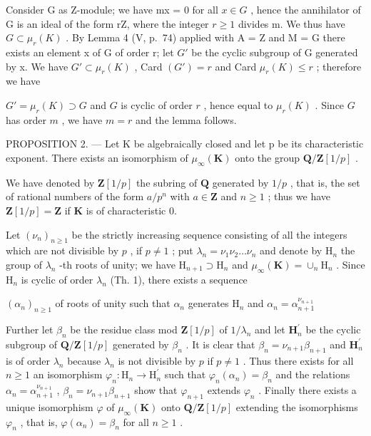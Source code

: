 Consider G as Z-module; we have mx = 0 for all \(x \in G\) , hence the annihilator of G is an ideal of the form rZ, where the integer \(r \geqslant 1\) divides m. We thus have \(G \subset \mu_{r}(K)\) . By Lemma 4 (V, p.~74) applied with A = Z and M = G there exists an element x of G of order r; let \(G'\) be the cyclic subgroup of G generated by x. We have \(G' \subset \mu_{r}(K)\) , Card \((G') = r\) and Card \(\mu_{r}(K) \leqslant r\) ; therefore we have

\(G' = \mu_r(K) \supset G\) and \(G\) is cyclic of order \(r\) , hence equal to \(\mu_r(K)\) . Since \(G\) has order \(m\) , we have \(m = r\) and the lemma follows.

PROPOSITION 2. --- Let K be algebraically closed and let p be its characteristic exponent. There exists an isomorphism of \(\mu_{\infty}(\mathbf{K})\) onto the group \(\mathbf{Q}/\mathbf{Z}[1/p]\) .

We have denoted by \(\mathbf{Z}[1/p]\) the subring of \(\mathbf{Q}\) generated by \(1/p\) , that is, the set of rational numbers of the form \(a/p^n\) with \(a \in \mathbf{Z}\) and \(n \geqslant 1\) ; thus we have \(\mathbf{Z}[1/p] = \mathbf{Z}\) if \(\mathbf{K}\) is of characteristic 0.

Let \((\nu_{n})_{n\geqslant 1}\) be the strictly increasing sequence consisting of all the integers which are not divisible by \(p\) , if \(p\neq 1\) ; put \(\lambda_{n} = \nu_{1}\nu_{2}\dots \nu_{n}\) and denote by \(\mathrm{H}_n\) the group of \(\lambda_{n}\) -th roots of unity; we have \(\mathrm{H}_{n + 1}\supset \mathrm{H}_n\) and \(\mu_{\infty}(\mathbf{K}) = \cup_{n}\mathrm{H}_{n}\) . Since \(\mathrm{H}_n\) is cyclic of order \(\lambda_{n}\) (Th. 1), there exists a sequence

\((\alpha_{n})_{n\geqslant 1}\) of roots of unity such that \(\alpha_{n}\) generates \(\mathrm{H}_n\) and \(\alpha_{n} = \alpha_{n + 1}^{\nu_{n + 1}}\)

Further let \(\beta_{n}\) be the residue class mod \(\mathbf{Z}[1/p]\) of \(1/\lambda_{n}\) and let \(\mathbf{H}_{n}^{\prime}\) be the cyclic subgroup of \(\mathbf{Q}/\mathbf{Z}[1/p]\) generated by \(\beta_{n}\) . It is clear that \(\beta_{n} = \nu_{n+1}\beta_{n+1}\) and \(\mathbf{H}_{n}^{\prime}\) is of order \(\lambda_{n}\) because \(\lambda_{n}\) is not divisible by \(p\) if \(p \neq 1\) . Thus there exists for all \(n \geqslant 1\) an isomorphism \(\varphi_{n}: \mathrm{H}_{n} \to \mathrm{H}_{n}^{\prime}\) such that \(\varphi_{n}(\alpha_{n}) = \beta_{n}\) and the relations \(\alpha_{n} = \alpha_{n+1}^{\nu_{n+1}}\) , \(\beta_{n} = \nu_{n+1}\beta_{n+1}\) show that \(\varphi_{n+1}\) extends \(\varphi_{n}\) . Finally there exists a unique isomorphism \(\varphi\) of \(\mu_{\infty}(\mathbf{K})\) onto \(\mathbf{Q}/\mathbf{Z}[1/p]\) extending the isomorphisms \(\varphi_{n}\) , that is, \(\varphi(\alpha_{n}) = \beta_{n}\) for all \(n \geqslant 1\) .

